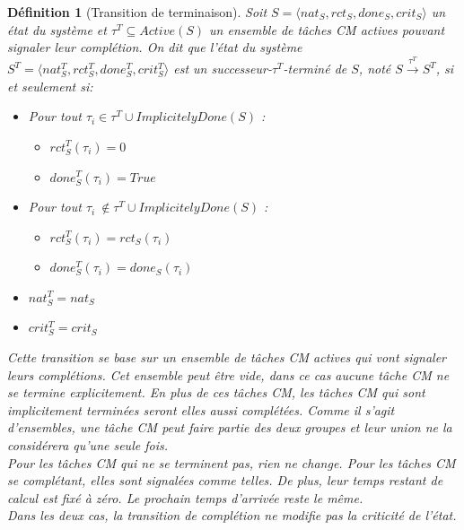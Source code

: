 \documentclass[12pt,a4paper,oneside]{book}
\theoremstyle{break}
\newtheorem{defin}{Définition}[chapter]
\theoremstyle{breakplain}
\begin{document}
\pagebreak

\begin{defin}[Transition de terminaison]
\label{spo:tterm}
Soit $S = \langle nat_S, rct_S, done_S, crit_S\rangle$ un état du système et $\tau^T \subseteq Active(S)$ un ensemble de tâches CM actives pouvant signaler leur complétion. On dit que l'état du système $S^T = \langle nat_S^T, rct_S^T, done_S^T, crit_S^T \rangle$ est un \textit{successeur-$\tau^T$-terminé} de $S$, noté $S\xrightarrow{\tau^T}S^T$, si et seulement si:

\begin{itemize}
\item Pour tout $\tau_i \in \tau^T \cup ImplicitelyDone(S)$ :\begin{itemize}
\item $rct_{S}^T(\tau_i) = 0$
\item $done_{S}^T(\tau_i) = True$
\end{itemize}
\item Pour tout $\tau_i\ \notin \tau^T \cup ImplicitelyDone(S)$ :\begin{itemize}
\item $rct_{S}^T(\tau_i) = rct_{S}(\tau_i)$
\item $done_{S}^T(\tau_i) = done_{S}(\tau_i)$
\end{itemize}
\item $nat_{S}^T = nat_{S}$
\item $crit_{S}^T = crit_{S}$\\
\end{itemize}

Cette transition se base sur un ensemble de tâches CM actives qui vont signaler leurs complétions. Cet ensemble peut être vide, dans ce cas aucune tâche CM ne se termine explicitement. En plus de ces tâches CM, les tâches CM qui sont implicitement terminées seront elles aussi complétées. Comme il s'agit d'ensembles, une tâche CM peut faire partie des deux groupes et leur union ne la considérera qu'une seule fois.\\

Pour les tâches CM qui ne se terminent pas, rien ne change. Pour les tâches CM se complétant, elles sont signalées comme telles. De plus, leur temps restant de calcul est fixé à zéro. Le prochain temps d'arrivée reste le même.\\
Dans les deux cas, la transition de complétion ne modifie pas la criticité de l'état.\\
\end{defin}
\end{document}
